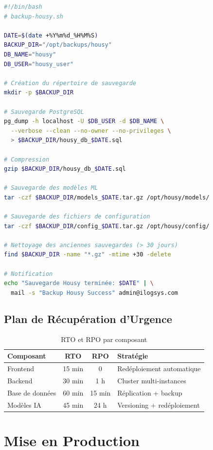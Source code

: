 \begin{lstlisting}[language=bash, caption=Script de sauvegarde automatique]
#!/bin/bash
# backup-housy.sh

DATE=$(date +%Y%m%d_%H%M%S)
BACKUP_DIR="/opt/backups/housy"
DB_NAME="housy"
DB_USER="housy_user"

# Création du répertoire de sauvegarde
mkdir -p $BACKUP_DIR

# Sauvegarde PostgreSQL
pg_dump -h localhost -U $DB_USER -d $DB_NAME \
  --verbose --clean --no-owner --no-privileges \
  > $BACKUP_DIR/housy_db_$DATE.sql

# Compression
gzip $BACKUP_DIR/housy_db_$DATE.sql

# Sauvegarde des modèles ML
tar -czf $BACKUP_DIR/models_$DATE.tar.gz /opt/housy/models/

# Sauvegarde des fichiers de configuration
tar -czf $BACKUP_DIR/config_$DATE.tar.gz /opt/housy/config/

# Nettoyage des anciennes sauvegardes (> 30 jours)
find $BACKUP_DIR -name "*.gz" -mtime +30 -delete

# Notification
echo "Sauvegarde Housy terminée: $DATE" | \
  mail -s "Backup Housy Success" admin@ilogsys.com
\end{lstlisting}

\subsection{Plan de Récupération d'Urgence}

\begin{table}[H]
\centering
\caption{RTO et RPO par composant}
\begin{tabular}{|l|c|c|l|}
\hline
\textbf{Composant} & \textbf{RTO} & \textbf{RPO} & \textbf{Stratégie} \\
\hline
Frontend & 15 min & 0 & Redéploiement automatique \\
Backend & 30 min & 1 h & Cluster multi-instances \\
Base de données & 60 min & 15 min & Réplication + backup \\
Modèles IA & 45 min & 24 h & Versioning + redéploiement \\
\hline
\end{tabular}
\label{tab:rto_rpo}
\end{table}

\section{Mise en Production}

